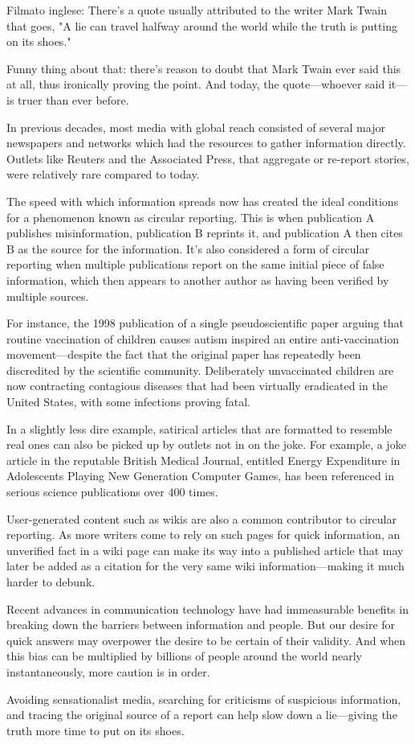 \begin{itshape}Filmato inglese:
There's a quote usually attributed to the writer Mark Twain that goes, "A lie can travel halfway around the world while the truth is putting on its shoes."\par
Funny thing about that: there's reason to doubt that Mark Twain ever said this at all, thus ironically proving the point. And today, the quote—whoever said it—is truer than ever before.\par
In previous decades, most media with global reach consisted of several major newspapers and networks which had the resources to gather information directly. Outlets like Reuters and the Associated Press, that aggregate or re-report stories, were relatively rare compared to today.\par
The speed with which information spreads now has created the ideal conditions for a phenomenon known as circular reporting. This is when publication A publishes misinformation, publication B reprints it, and publication A then cites B as the source for the information. It's also considered a form of circular reporting when multiple publications report on the same initial piece of false information, which then appears to another author as having been verified by multiple sources.\par
For instance, the 1998 publication of a single pseudoscientific paper arguing that routine vaccination of children causes autism inspired an entire anti-vaccination movement—despite the fact that the original paper has repeatedly been discredited by the scientific community. Deliberately unvaccinated children are now contracting contagious diseases that had been virtually eradicated in the United States, with some infections proving fatal.\par
In a slightly less dire example, satirical articles that are formatted to resemble real ones can also be picked up by outlets not in on the joke. For example, a joke article in the reputable British Medical Journal, entitled Energy Expenditure in Adolescents Playing New Generation Computer Games, has been referenced in serious science publications over 400 times.\par
User-generated content such as wikis are also a common contributor to circular reporting. As more writers come to rely on such pages for quick information, an unverified fact in a wiki page can make its way into a published article that may later be added as a citation for the very same wiki information—making it much harder to debunk.\par
Recent advances in communication technology have had immeasurable benefits in breaking down the barriers between information and people. But our desire for quick answers may overpower the desire to be certain of their validity. And when this bias can be multiplied by billions of people around the world nearly instantaneously, more caution is in order.\par
Avoiding sensationalist media, searching for criticisms of suspicious information, and tracing the original source of a report can help slow down a lie—giving the truth more time to put on its shoes.
\end{itshape}\par

